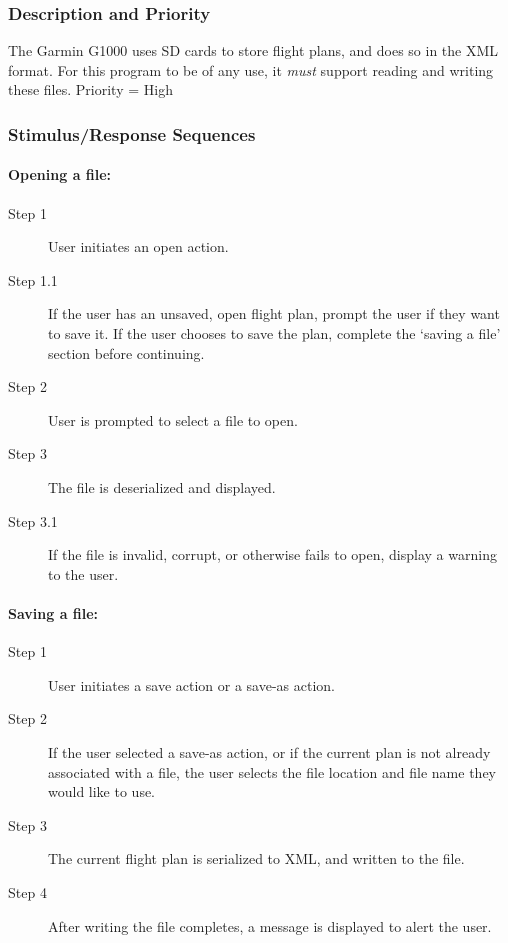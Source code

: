 \documentclass[12pt, letterpaper]{article}
\begin{document}
          \subsubsection{Description and Priority}
            The Garmin G1000 uses SD cards to store flight plans, and does so in the XML format.
            For this program to be of any use, it \emph{must} support reading and writing these files.
            Priority = High
          \subsubsection{Stimulus/Response Sequences}
            \paragraph{Opening a file:}
            \begin{description}
              \item[Step 1] User initiates an open action.
              \item[Step 1.1] If the user has an unsaved, open flight plan, prompt the user if they want to save it.
                If the user chooses to save the plan, complete the `saving a file' section before continuing.
              \item[Step 2] User is prompted to select a file to open.
              \item[Step 3] The file is deserialized and displayed.
              \item[Step 3.1] If the file is invalid, corrupt, or otherwise fails to open, display a warning to the user.
            \end{description}
            \paragraph{Saving a file:}
            \begin{description}
              \item[Step 1] User initiates a save action or a save-as action.
              \item[Step 2] If the user selected a save-as action, or if the current plan is not already associated with a file,
                the user selects the file location and file name they would like to use.
              \item[Step 3] The current flight plan is serialized to XML, and written to the file.
              \item[Step 4] After writing the file completes, a message is displayed to alert the user.
            \end{description}
\end{document}
